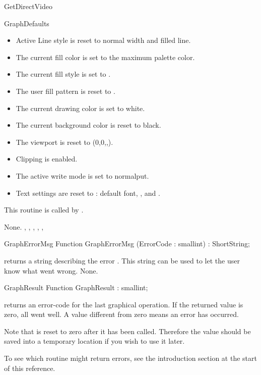 \begin{function}{GetDirectVideo}
\begin{procedure}{GraphDefaults}
\begin{itemize}
 \item Active Line style is reset to normal width and filled line.
 \item The current fill color is set to the maximum palette color.
 \item The current fill style is set to .
 \item The user fill pattern is reset to .
 \item The current drawing color is set to white.
 \item The current background color is reset to black.
 \item The viewport is reset to (0,0,,).
 \item Clipping is enabled.
 \item The active write mode is set to normalput.
 \item Text settings are reset to : default font, ,
          and .
\end{itemize}

This routine is called by .

\Errors
None.
\SeeAlso
{}, , ,
, , 
\end{procedure}

\begin{function}{GraphErrorMsg}
\Declaration
Function GraphErrorMsg (ErrorCode : smallint) : ShortString;

\Description
{}
returns a string describing the error . This string can be
used to let the user know what went wrong.
\Errors
None.
\SeeAlso
{}
\end{function}
\begin{function}{GraphResult}
\Declaration
Function GraphResult  : smallint;

\Description
{} returns an error-code for
the last graphical operation. If the returned value is zero, all went well.
A value different from zero means an error has occurred.

Note that  is reset to zero after it has been called.
Therefore the value should be saved into a temporary location if you wish
to use it later.

To see which routine might return errors, see the introduction section at
the start of this reference.


\end{function}
\end{function}
